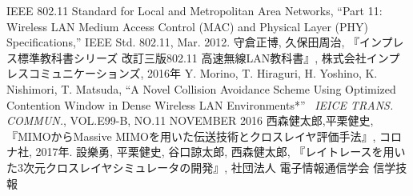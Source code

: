 \documentclass[a4paper,10pt]{ltjsarticle}
\begin{document}
\clearpage
{}
\begin{thebibliography}{99}
  IEEE 802.11 Standard for Local and Metropolitan Area
  Networks, “Part 11: Wireless LAN Medium Access Control (MAC) and Physical Layer (PHY) Speciﬁcations,”  IEEE Std. 802.11, Mar. 2012.
守倉正博, 久保田周治, 『インプレス標準教科書シリーズ 改訂三版802.11 高速無線LAN教科書』, 株式会社インプレスコミュニケーションズ, 2016年
Y. Morino, T. Hiraguri, H. Yoshino, K. Nishimori, T. Matsuda, ``A Novel Collision Avoidance Scheme Using Optimized Contention Window in Dense Wireless LAN Environments*'' \, \textit{IEICE TRANS. COMMUN.}, VOL.E99-B, NO.11 NOVEMBER 2016
西森健太郎,平栗健史,『MIMOからMassive MIMOを用いた伝送技術とクロスレイヤ評価手法』, コロナ社, 2017年.
設樂勇, 平栗健史, 谷口諒太郎, 西森健太郎, 『レイトレースを用いた3次元クロスレイヤシミュレータの開発』, 社団法人 電子情報通信学会 信学技報
\end{thebibliography}
\end{document}
